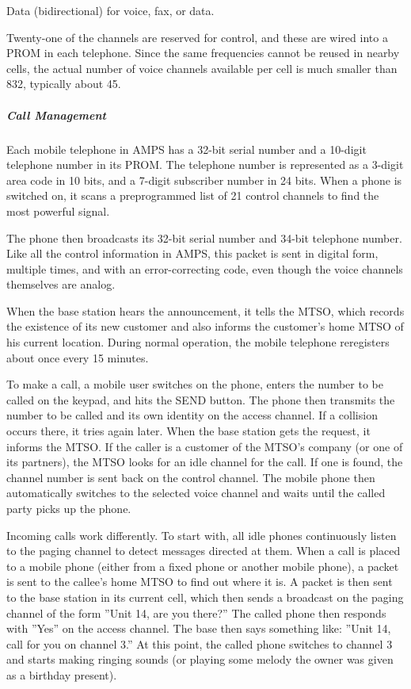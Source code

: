 \documentclass[b5paper,11pt]{memoir}
\begin{document}
Data (bidirectional) for voice, fax, or data.

Twenty-one of the channels are reserved for control, and these are wired
into a PROM in each telephone. Since the same frequencies cannot be
reused in nearby cells, the actual number of voice channels available
per cell is much smaller than 832, typically about 45.

\protect\hypertarget{0130661023_ch02lev1sec6.htmlux5cux23ch02lev3sec21}{}{}

\subparagraph{Call Management}

Each mobile telephone in AMPS has a 32-bit serial number and a 10-digit
telephone number in its PROM. The telephone number is represented as a
3-digit area code in 10 bits, and a 7-digit subscriber number in 24
bits. When a phone is switched on, it scans a preprogrammed list of 21
control channels to find the most powerful signal.

The phone then broadcasts its 32-bit serial number and 34-bit telephone
number. Like all the control information in AMPS, this packet is sent in
digital form, multiple times, and with an error-correcting code, even
though the voice channels themselves are analog.

When the base station hears the announcement, it tells the MTSO, which
records the existence of its new customer and also informs the
customer's home MTSO of his current location. During normal operation,
the mobile telephone reregisters about once every 15 minutes.

To make a call, a mobile user switches on the phone, enters the number
to be called on the keypad, and hits the SEND button. The phone then
transmits the number to be called and its own identity on the access
channel. If a collision occurs there, it tries again later. When the
base station gets the request, it informs the MTSO. If the caller is a
customer of the MTSO's company (or one of its partners), the MTSO looks
for an idle channel for the call. If one is found, the channel number is
sent back on the control channel. The mobile phone then automatically
switches to the selected voice channel and waits until the called party
picks up the phone.

Incoming calls work differently. To start with, all idle phones
continuously listen to the paging channel to detect messages directed at
them. When a call is placed to a mobile phone (either from a fixed phone
or another mobile phone), a packet is sent to the callee's home MTSO to
find out where it is. A packet is then sent to the base station in its
current cell, which then sends a broadcast on the paging channel of the
form ''Unit 14, are you there?'' The called phone then responds with
''Yes'' on the access channel. The base then says something like: ''Unit
14, call for you on channel 3.'' At this point, the called phone
switches to channel 3 and starts making ringing sounds (or playing some
melody the owner was given as a birthday present).
\end{document}
